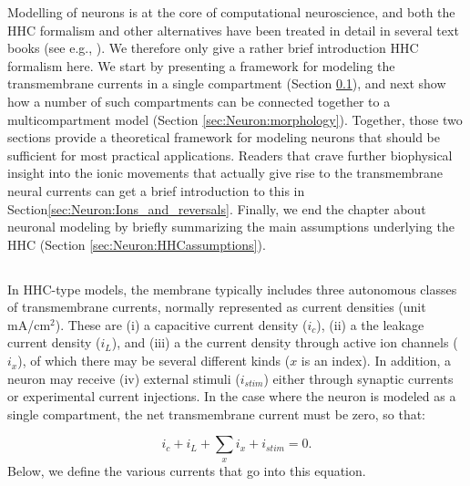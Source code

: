 Modelling of neurons is at the core of computational neuroscience, and both the HHC formalism and other alternatives have been treated in detail in several text books (see e.g., \citep{johnston1994foundations, KockSegev1998, Koch1999, Hille2001, Dayan2005, Sterratt2011}). We therefore only give a rather brief introduction HHC formalism here. We start by presenting a framework for modeling the transmembrane currents in a single compartment (Section \ref{sec:Neuron:membranecurrents}), and next show how a number of such compartments can be connected together to a multicompartment model (Section \ref{sec:Neuron:morphology}). Together, those two sections provide a theoretical framework for modeling neurons that should be sufficient for most practical applications. Readers that crave further biophysical insight into the ionic movements that actually give rise to the transmembrane neural currents can get a brief introduction to this in Section\ref{sec:Neuron:Ions_and_reversals}. Finally, we end the chapter about neuronal modeling by briefly summarizing the main assumptions underlying the HHC (Section \ref{sec:Neuron:HHCassumptions}).


\subsection{}
\label{sec:Neuron:membranecurrents}
In HHC-type models, the membrane typically includes three autonomous classes of transmembrane currents, normally represented as current densities (unit mA/cm$^2$). These are (i) a capacitive current density ($i_c$), (ii) a the leakage current density ($i_L$), and (iii) a the current density through active ion channels ($i_x$), of which there may be several different kinds ($x$ is an index). In addition, a neuron may receive  (iv) external stimuli ($i_{stim}$) either through synaptic currents or experimental current injections. In the case where the neuron is modeled as a single compartment, the net transmembrane current must be zero, so that:

\begin{equation}
i_c + i_L + \sum_x{i_x} +  i_{stim} = 0.
\label{Neuron:eq:singlecomp_zerosum}
\end{equation}
Below, we define the various currents that go into this equation.


\subsubsection{}
\label{sec:Neuron:Cap}

